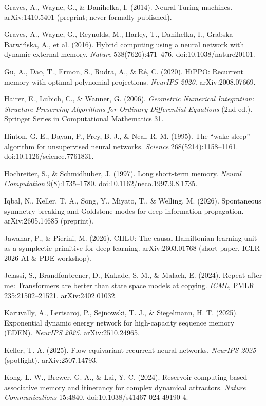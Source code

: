 \documentclass[10pt]{article}
\begin{document}
{Graves, A., Wayne, G., \& Danihelka, I. (2014). Neural Turing machines. arXiv:1410.5401 (preprint; never formally published).\par
Graves, A., Wayne, G., Reynolds, M., Harley, T., Danihelka, I., Grabska-Barwi\'nska, A., et al. (2016). Hybrid computing using a neural network with dynamic external memory. \emph{Nature} 538(7626):471--476. doi:10.1038/nature20101.\par
Gu, A., Dao, T., Ermon, S., Rudra, A., \& R\'e, C. (2020). HiPPO: Recurrent memory with optimal polynomial projections. \emph{NeurIPS 2020}. arXiv:2008.07669.\par
Hairer, E., Lubich, C., \& Wanner, G. (2006). \emph{Geometric Numerical Integration: Structure-Preserving Algorithms for Ordinary Differential Equations} (2nd ed.). Springer Series in Computational Mathematics 31.\par
Hinton, G. E., Dayan, P., Frey, B. J., \& Neal, R. M. (1995). The ``wake-sleep'' algorithm for unsupervised neural networks. \emph{Science} 268(5214):1158--1161. doi:10.1126/science.7761831.\par
Hochreiter, S., \& Schmidhuber, J. (1997). Long short-term memory. \emph{Neural Computation} 9(8):1735--1780. doi:10.1162/neco.1997.9.8.1735.\par
Iqbal, N., Keller, T. A., Song, Y., Miyato, T., \& Welling, M. (2026). Spontaneous symmetry breaking and Goldstone modes for deep information propagation. arXiv:2605.14685 (preprint).\par
Jawahar, P., \& Pierini, M. (2026). CHLU: The causal Hamiltonian learning unit as a symplectic primitive for deep learning. arXiv:2603.01768 (short paper, ICLR 2026 AI \& PDE workshop).\par
Jelassi, S., Brandfonbrener, D., Kakade, S. M., \& Malach, E. (2024). Repeat after me: Transformers are better than state space models at copying. \emph{ICML}, PMLR 235:21502--21521. arXiv:2402.01032.\par
Karuvally, A., Lertsaroj, P., Sejnowski, T. J., \& Siegelmann, H. T. (2025). Exponential dynamic energy network for high-capacity sequence memory (EDEN). \emph{NeurIPS 2025}. arXiv:2510.24965.\par
Keller, T. A. (2025). Flow equivariant recurrent neural networks. \emph{NeurIPS 2025} (spotlight). arXiv:2507.14793.\par
Kong, L.-W., Brewer, G. A., \& Lai, Y.-C. (2024). Reservoir-computing based associative memory and itinerancy for complex dynamical attractors. \emph{Nature Communications} 15:4840. doi:10.1038/s41467-024-49190-4.\par
}
\end{document}
